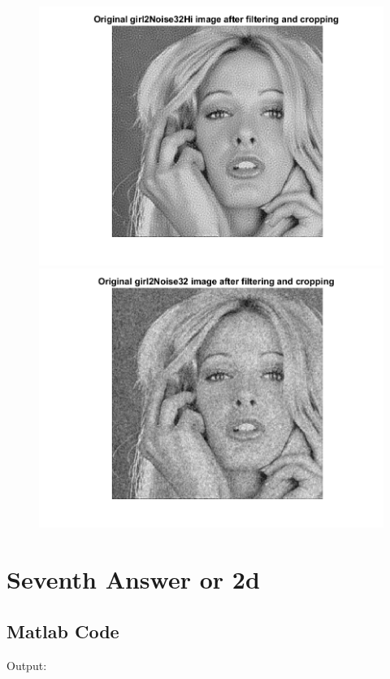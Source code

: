 \documentclass[11pt]{article} %
\begin{document}
\begin{figure}
 \centering
	\includegraphics{2ce.png}
	\includegraphics{2cf.png}
\end{figure}
\clearpage

\section {Seventh Answer or 2d}
\subsection*{Matlab Code}


Output:
\end{document}
